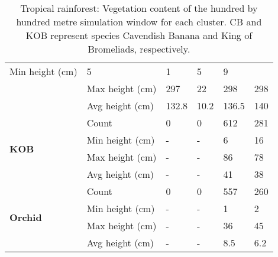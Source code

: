 \begin{table}[htb!]
\begin{tabular}{|p{2cm}|p{2cm}|p{2cm}|p{2cm}|p{2cm}|p{2cm}|}
						\multicolumn{1}{l|}{Min height (cm)} & 
						\multicolumn{1}{l|}{5} & 
						\multicolumn{1}{l|}{1} &
						\multicolumn{1}{l|}{5} & 
						\multicolumn{1}{l|}{9} \\\cline{2-6} &
						\multicolumn{1}{l|}{Max height (cm)} & 
						\multicolumn{1}{l|}{297} & 
						\multicolumn{1}{l|}{22} &
						\multicolumn{1}{l|}{298} & 
						\multicolumn{1}{l|}{298} \\\cline{2-6} &
						\multicolumn{1}{l|}{Avg height (cm)} & 
						\multicolumn{1}{l|}{132.8} & 
						\multicolumn{1}{l|}{10.2} &
						\multicolumn{1}{l|}{136.5} & 
						\multicolumn{1}{l|}{140} \\\cline{2-6}
		\hline      
		\multirow{4}{*}{\textbf{KOB}} & 
						\multicolumn{1}{l|}{Count} & 
						\multicolumn{1}{l|}{0} & 
						\multicolumn{1}{l|}{0} &
						\multicolumn{1}{l|}{612} & 
						\multicolumn{1}{l|}{281} \\\cline{2-6} &
						\multicolumn{1}{l|}{Min height (cm)} & 
						\multicolumn{1}{l|}{-} & 
						\multicolumn{1}{l|}{-} &
						\multicolumn{1}{l|}{6} & 
						\multicolumn{1}{l|}{16} \\\cline{2-6} &
						\multicolumn{1}{l|}{Max height (cm)} & 
						\multicolumn{1}{l|}{-} & 
						\multicolumn{1}{l|}{-} &
						\multicolumn{1}{l|}{86} & 
						\multicolumn{1}{l|}{78} \\\cline{2-6} &
						\multicolumn{1}{l|}{Avg height (cm)} & 
						\multicolumn{1}{l|}{-} & 
						\multicolumn{1}{l|}{-} &
						\multicolumn{1}{l|}{41} & 
						\multicolumn{1}{l|}{38} \\\cline{2-6}
		\hline     
		\multirow{4}{*}{\textbf{Orchid}} & 
						\multicolumn{1}{l|}{Count} & 
						\multicolumn{1}{l|}{0} & 
						\multicolumn{1}{l|}{0} &
						\multicolumn{1}{l|}{557} & 
						\multicolumn{1}{l|}{260} \\\cline{2-6} &
						\multicolumn{1}{l|}{Min height (cm)} & 
						\multicolumn{1}{l|}{-} & 
						\multicolumn{1}{l|}{-} &
						\multicolumn{1}{l|}{1} & 
						\multicolumn{1}{l|}{2} \\\cline{2-6} &
						\multicolumn{1}{l|}{Max height (cm)} & 
						\multicolumn{1}{l|}{-} & 
						\multicolumn{1}{l|}{-} &
						\multicolumn{1}{l|}{36} & 
						\multicolumn{1}{l|}{45} \\\cline{2-6} &
						\multicolumn{1}{l|}{Avg height (cm)} & 
						\multicolumn{1}{l|}{-} & 
						\multicolumn{1}{l|}{-} &
						\multicolumn{1}{l|}{8.5} & 
						\multicolumn{1}{l|}{6.2} \\\cline{2-6}
		\hline                                                       
		\end{tabular}
	\caption{Tropical rainforest: Vegetation content of the hundred by hundred metre simulation window for each cluster. CB and KOB represent species Cavendish Banana and King of Bromeliads, respectively.}
	\label{tab:results_tropical_species_cluster_properties}	
\end{table}

